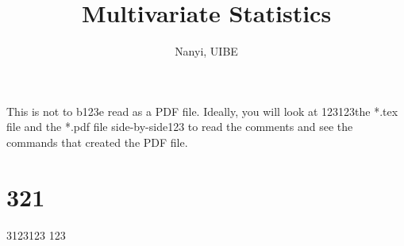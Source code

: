 \documentclass[12pt]{book}
\theoremstyle{definition}
\begin{document}
\title{Multivariate Statistics}
\author{Nanyi, UIBE}
\maketitle 
This is not to b123e read as a PDF file.  Ideally, you will look at 123123the *.tex file and the *.pdf file side-by-side123 to read the comments and see the commands that created the PDF file.
\tableofcontents
\chapter{321}
3123123
123
\end{document}
